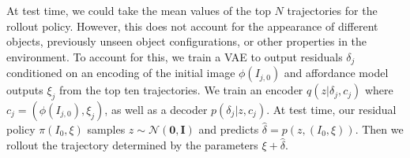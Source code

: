 At test time, we could take the mean values of the top $N$ trajectories for the rollout policy.  However, this does not account for the appearance of different objects, previously unseen object configurations, or other properties in the environment. To account for this, we train a VAE \cite{SohnNIPS2015, rezende2014stochastic, rezende2014vae, kingma2013vae} to output residuals $\delta_j$ conditioned on an encoding of the initial image $\phi(I_{j, 0})$ and affordance model outputs $\xi_j$ from the top ten trajectories. We train an encoder $q(z | \delta_j, c_j)$ where $c_j = (\phi(I_{j, 0}), \xi_j)$, as well as a decoder $p(\delta_j | z, c_j)$. At test time, our residual policy $\pi (I_0, \xi)$ samples $z \sim \mathcal{N}(\mathbf{0}, \mathbf{I})$ and predicts $\hat{\delta} = p(z, (I_0, \xi))$. Then we rollout the trajectory determined by the parameters $\xi + \hat{\delta}$.

